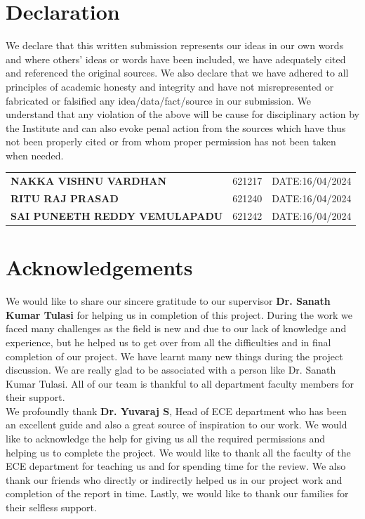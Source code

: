 \documentclass[12pt, a4paper]{report}
\begin{document}
\newpage

\chapter*{Declaration}

We declare that this written submission represents our ideas in our own words and where others' ideas or words have been included, we have adequately cited and referenced the original sources. We also declare that we have adhered to all principles of academic honesty and integrity and have not misrepresented or fabricated or falsified any idea/data/fact/source in our submission. We understand that any violation of the above will be cause for disciplinary action by the Institute and can also evoke penal action from the sources which have thus not been properly cited or from whom proper permission has not been taken when needed.

\vspace{2cm}

\begin{tabular}{@{}l l l@{}}
    \textbf{NAKKA VISHNU VARDHAN} & 621217 & DATE:16/04/2024 \\
    \textbf{RITU RAJ PRASAD} & 621240 & DATE:16/04/2024 \\
    \textbf{SAI PUNEETH REDDY VEMULAPADU} & 621242 & DATE:16/04/2024 \\
\end{tabular}

\newpage

\chapter*{Acknowledgements}

We would like to share our sincere gratitude to our supervisor \textbf{Dr. Sanath Kumar Tulasi} for helping us in completion of this project. During the work we faced many challenges as the field is new and due to our lack of knowledge and experience, but he helped us to get over from all the difficulties and in final completion of our project. We have learnt many new things during the project discussion. We are really glad to be associated with a person like Dr. Sanath Kumar Tulasi. All of our team is thankful to all department faculty members for their support.\\

We profoundly thank \textbf{Dr. Yuvaraj S}, Head of ECE department who has been an excellent guide and also a great source of inspiration to our work. We would like to acknowledge the help for giving us all the required permissions and helping us to complete the project. We would like to thank all the faculty of the ECE department for teaching us and for spending time for the review. We also thank our friends who directly or indirectly helped us in our project work and completion of the report in time. Lastly, we would like to thank our families for their selfless support.
\end{document}

